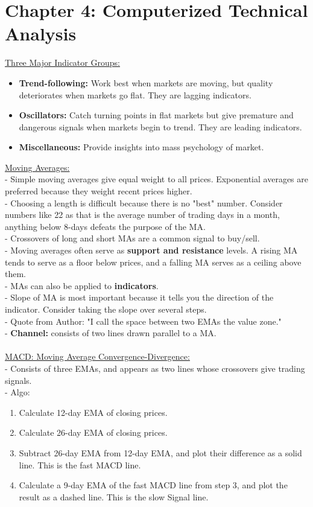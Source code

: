 \documentclass[12pt,fullpage]{article}
\begin{document}
\section*{Chapter 4: Computerized Technical Analysis}
\underline{Three Major Indicator Groups:}
\begin{itemize}
   \itemsep0em
   \item \textbf{Trend-following:} Work best when markets are moving, but quality deteriorates when markets go flat. They are lagging indicators.
   \item \textbf{Oscillators:} Catch turning points in flat markets but give premature and dangerous signals when markets begin to trend. They are leading indicators.
   \item \textbf{Miscellaneous:} Provide insights into mass psychology of market. 
\end{itemize}
\underline{Moving Averages:}\\
- Simple moving averages give equal weight to all prices. Exponential averages are preferred because they weight recent prices higher.\\
- Choosing a length is difficult because there is no "best" number. Consider numbers like 22 as that is the average number of trading days in a month, anything below 8-days defeats the purpose of the MA.\\
- Crossovers of long and short MAs are a common signal to buy/sell.\\
- Moving averages often serve as \textbf{support and resistance} levels. A rising MA tends to serve as a floor below prices, and a falling MA serves as a ceiling above them.\\
- MAs can also be applied to \textbf{indicators}.\\
- Slope of MA is most important because it tells you the direction of the indicator. Consider taking the slope over several steps.\\
- Quote from Author: "I call the space between two EMAs the value zone."\\
- \textbf{Channel:} consists of two lines drawn parallel to a MA.\\
\\
\underline{MACD: Moving Average Convergence-Divergence:}\\
- Consists of three EMAs, and appears as two lines whose crossovers give trading signals.\\
- Algo:
\begin{enumerate}
   \itemsep0em
   \item Calculate 12-day EMA of closing prices.
   \item Calculate 26-day EMA of closing prices.
   \item Subtract 26-day EMA from 12-day EMA, and plot their difference as a solid line. This is the fast MACD line.
   \item Calculate a 9-day EMA of the fast MACD line from step 3, and plot the result as a dashed line. This is the slow Signal line.
\end{enumerate}
\end{document}

